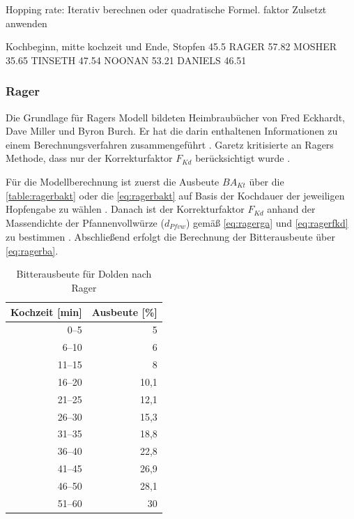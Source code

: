 \documentclass[a4paper,parskip=half]{scrartcl}
\newcommand{\BAKt}{{\mathit{BA}}_{\mathit{Kt}}}
\newcommand{\FKd}{F_{\mathit{Kd}}}
\newcommand{\dPfvw}{d_\mathit{Pfvw}}
\begin{document}
\parencite[63]{Hall1997}
Hopping rate:
Iterativ berechnen oder quadratische
Formel. 
faktor Zulsetzt anwenden

\parencite[65]{Hall1997}
Kochbeginn, mitte kochzeit und Ende, Stopfen
45.5
RAGER  57.82
MOSHER 35.65
TINSETH  47.54
NOONAN 53.21
DANIELS 46.51

\subsubsection*{Rager}

Die Grundlage für Ragers Modell bildeten Heimbraubücher von Fred Eckhardt,
Dave Miller und Byron Burch. Er hat die darin enthaltenen Informationen
zu einem Berechnungsverfahren zusammengeführt \parencite[53]{Rager1990}. 
Garetz kritisierte an Ragers Methode, dass nur der Korrekturfaktor
$\FKd$ berücksichtigt wurde \parencite[134]{Garetz1994}.

Für die Modellberechnung ist zuerst die Ausbeute $\BAKt$ über die \autoref{table:ragerbakt}
oder die \autoref{eq:ragerbakt} auf Basis der Kochdauer der jeweiligen Hopfengabe
zu wählen \parencite{Steinmeyer2021}.
Danach ist der Korrekturfaktor $\FKd$ anhand der Massendichte der
Pfannenvollwürze ($\dPfvw$) gemäß \autoref{eq:ragerga} und \autoref{eq:ragerfkd}
zu bestimmen \parencite[53]{Rager1990}.
Abschließend erfolgt die Berechnung der Bitterausbeute über \autoref{eq:ragerba}.

\begin{table}[H]
\centering
\begin{tabular}{rr}
\toprule
\multicolumn{1}{c}{\textbf{Kochzeit [min]}} & \multicolumn{1}{c}{\textbf{Ausbeute [\%]}} \\
\midrule
0–5             & 5 \\
6–10            & 6 \\
11–15           & 8 \\
16–20           & 10,1 \\
21–25           & 12,1 \\
26–30           & 15,3 \\
31–35           & 18,8 \\
36–40           & 22,8 \\
41–45           & 26,9 \\
46–50           & 28,1 \\
51–60           & 30 \\
\bottomrule
\end{tabular}
\caption{Bitterausbeute für Dolden nach Rager \parencite[54]{Rager1990}}
\label{table:ragerbakt}
\end{table}
\end{document}

